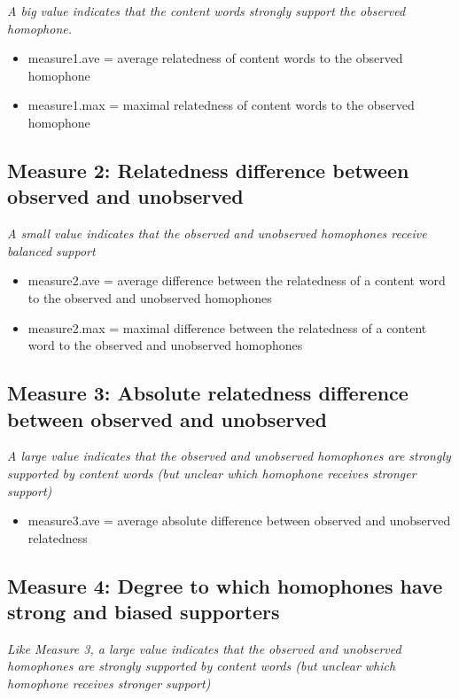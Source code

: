 \documentclass{article}
\begin{document}
\emph{A big value indicates that the content words strongly support the observed homophone.}

\begin{itemize}

\item[] measure1.ave = average relatedness of content words to the observed homophone

\item[] measure1.max = maximal relatedness of content words to the observed homophone

\end{itemize}

\subsection*{Measure 2: Relatedness difference between observed and unobserved}

\emph{A small value indicates that the observed and unobserved homophones receive balanced support}

\begin{itemize}
\item[] measure2.ave = average difference between the relatedness of a content word to the observed and unobserved homophones

\item[] measure2.max = maximal difference between the relatedness of a content word to the observed and unobserved homophones

\end{itemize}

\subsection*{Measure 3: Absolute relatedness difference between observed and unobserved}

\emph{ A large value indicates that the observed and unobserved homophones are strongly supported by content words (but unclear which homophone receives stronger support)}
 
\begin{itemize}
\item[] measure3.ave = average absolute difference between observed and unobserved relatedness

\end{itemize}

\subsection*{Measure 4: Degree to which homophones have strong and biased supporters}
\emph{Like Measure 3, a large value indicates that the observed and unobserved homophones are strongly supported by content words (but unclear which homophone receives stronger support)}
\end{document}
